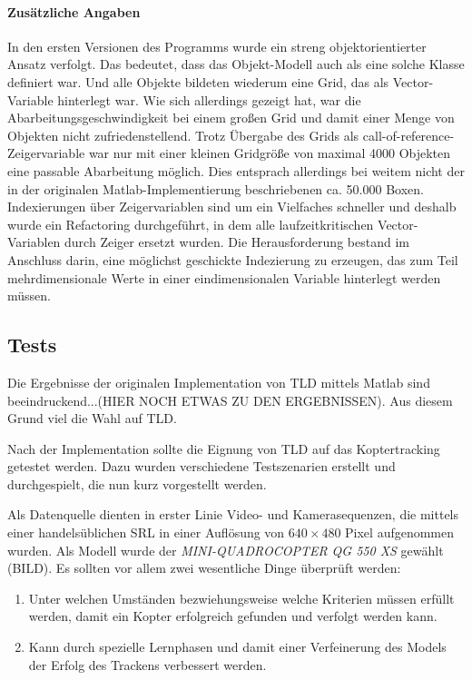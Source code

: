 \paragraph{Zusätzliche Angaben}
In den ersten Versionen des Programms wurde ein streng objektorientierter Ansatz verfolgt. Das bedeutet, dass das Objekt-Modell auch als eine solche Klasse definiert war. Und alle Objekte bildeten wiederum eine Grid, das als Vector-Variable hinterlegt war. Wie sich allerdings gezeigt hat, war die Abarbeitungsgeschwindigkeit bei einem großen Grid und damit einer Menge von Objekten nicht zufriedenstellend. Trotz Übergabe des Grids als call-of-reference-Zeigervariable war nur mit einer kleinen Gridgröße von maximal 4000 Objekten eine passable Abarbeitung möglich. Dies entsprach allerdings bei weitem nicht der in der originalen Matlab-Implementierung beschriebenen ca. 50.000 Boxen. Indexierungen über Zeigervariablen sind um ein Vielfaches schneller und deshalb wurde ein Refactoring durchgeführt, in dem alle laufzeitkritischen Vector-Variablen durch Zeiger ersetzt wurden. Die Herausforderung bestand im Anschluss darin, eine möglichst geschickte Indezierung zu erzeugen, das zum Teil mehrdimensionale Werte in einer eindimensionalen Variable hinterlegt werden müssen.

\subsection{Tests}
Die Ergebnisse der originalen Implementation von TLD mittels Matlab sind beeindruckend...(HIER NOCH ETWAS ZU DEN ERGEBNISSEN). Aus diesem Grund viel die Wahl auf TLD.

Nach der Implementation sollte die Eignung von TLD auf das Koptertracking getestet werden. Dazu wurden verschiedene Testszenarien erstellt und durchgespielt, die nun kurz vorgestellt werden.

Als Datenquelle dienten in erster Linie Video- und Kamerasequenzen, die mittels einer handelsüblichen SRL in einer Auflösung von $640\times480$ Pixel aufgenommen wurden. Als Modell wurde der \textit{MINI-QUADROCOPTER QG 550 XS} gewählt (BILD). Es sollten vor allem zwei wesentliche Dinge überprüft werden:

\begin{enumerate}
\item Unter welchen Umständen bezwiehungsweise welche Kriterien müssen erfüllt werden, damit ein Kopter erfolgreich gefunden und verfolgt werden kann.
\item Kann durch spezielle Lernphasen und damit einer Verfeinerung des Models der Erfolg des Trackens verbessert werden.
\end{enumerate}

